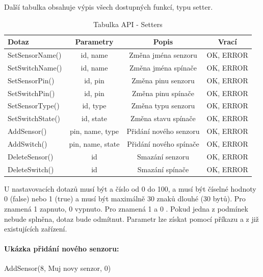 \documentclass[FM,DP]{tulthesis}  %
\begin{document}
Další tabulka obsahuje výpis všech dostupných funkcí, typu setter.

\renewcommand{\arraystretch}{1.5}
\begin{table}[H]
\begin{center}
\begin{tabular}{| l | c | c| c |}
\hline
Dotaz & Parametry & Popis & Vrací\\
\hline
\hline
SetSensorName() & id, name & Změna jména senzoru & OK, ERROR \\
\hline
SetSwitchName() & id, name & Změna jména spínače & OK, ERROR \\
\hline
SetSensorPin() & id, pin & Změna pinu senzoru & OK, ERROR \\
\hline
SetSwitchPin() & id, pin & Změna pinu spínače & OK, ERROR \\
\hline
SetSensorType() & id, type & Změna typu senzoru & OK, ERROR \\
\hline
SetSwitchState() & id, state & Změna stavu spínače & OK, ERROR \\
\hline
AddSensor() & pin, name, type & Přidání nového senzoru & OK, ERROR \\
\hline
AddSwitch() & pin, name, state & Přidání nového spínače & OK, ERROR \\
\hline
DeleteSensor() & id & Smazání senzoru & OK, ERROR \\
\hline
DeleteSwitch() & id & Smazání spínače & OK, ERROR \\
\hline
\end{tabular}
\end{center}
\caption{Tabulka API - Setters}
\end{table}

U nastavovacích dotazů musí být  a  číslo od 0 do 100,  a  musí být číselné hodnoty 0 (false) nebo 1 (true) a  musí být maximálně 30 znaků dlouhé (30 bytů). Pro  znamená 1 zapnuto, 0 vypnuto. Pro  znamená 1  a 0 . Pokud jedna z podmínek nebude splněna, dotaz bude odmítnut. Parametr  lze získat pomocí příkazu  a  z již existujících zařízení.

\paragraph{Ukázka přidání nového senzoru:}
\begin{center}
AddSensor(8, Muj novy senzor, 0)
\end{center}
\end{document}

